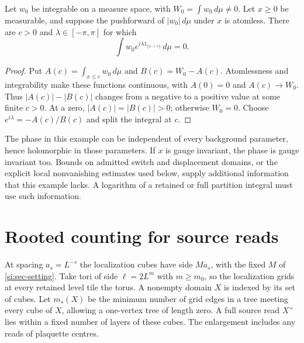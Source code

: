 \documentclass[11pt,letterpaper,reqno]{amsart}
\makeatletter
\numberwithin{equation}{section}
\theoremstyle{definition}
\newcommand{\ms@minorstart}{%
  \pushQED{\qed}\renewcommand{\qedsymbol}{$\blacksquare$}}
\newenvironment{lemma}[1][]{\ms@minorstart\ms@lemma[#1]}
  {\popQED\endms@lemma}
\theoremstyle{remark}
\makeatother
\begin{document}
\begin{samepage}
\begin{lemma}[A phase can cancel a tested integral]
\label{si:lem-phase-zero}
Let $w_0$ be integrable on a measure space, with
$W_0=\int w_0\,d\mu\ne0$. Let $x\ge0$ be measurable, and suppose
the pushforward of $|w_0|\,d\mu$ under $x$ is atomless. There
are $c>0$ and $\lambda\in[-\pi,\pi]$ for which
\[
            \int w_0 e^{i\lambda 1_{\{x>c\}}}\,d\mu=0.
\]
\end{lemma}
\end{samepage}
\begin{proof}
Put $A(c)=\int_{x\le c}w_0\,d\mu$ and $B(c)=W_0-A(c)$.
Atomlessness and integrability make these functions continuous,
with $A(0)=0$ and $A(c)\to W_0$. Thus $|A(c)|-|B(c)|$ changes
from a negative to a positive value at some finite $c>0$.
At a zero, $|A(c)|=|B(c)|>0$; otherwise $W_0=0$.
Choose $e^{i\lambda}=-A(c)/B(c)$ and split the integral at $c$.
\end{proof}

The phase in this example can be independent of every background
parameter, hence holomorphic in those parameters. If $x$ is
gauge invariant, the phase is gauge invariant too. Bounds on
admitted switch and displacement domains, or the explicit local
nonvanishing estimates used below, supply additional information
that this example lacks. A logarithm of a retained or full
partition integral must use such information.


\section{Rooted counting for source reads}
\label{si:sec-source-count}

At spacing $a_s=L^{-s}$ the localization cubes have side $Ma_s$,
with the fixed $M$ of \cref{si:sec-setting}. Take tori of side $\ell=2L^m$ with
$m\ge m_0$, so the localization grids at every retained level tile
the torus. A nonempty domain $X$ is indexed by its set of cubes.
Let $m_s(X)$ be the minimum number of grid edges in a tree
meeting every cube of $X$, allowing a one-vertex tree of length
zero. A full source read $X^+$ lies within a fixed number of
layers of these cubes. The enlargement includes any reads of
plaquette centres.
\end{document}
